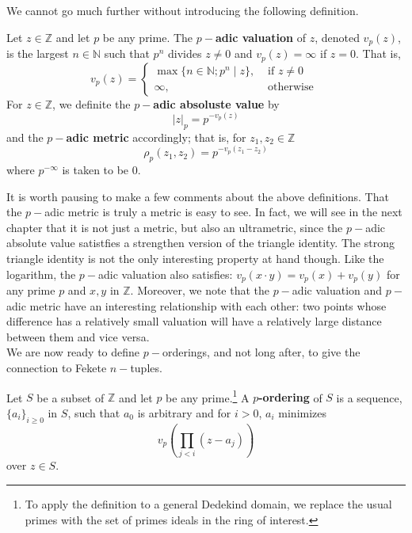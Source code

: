 We cannot go much further without introducing the following definition. 

\begin{definition}
Let $z \in \mathbb{Z}$ and let $p$ be any prime. The \textbf{$p-$adic valuation} of $z$, denoted $v_p(z)$, is the largest $n \in \mathbb{N}$ such that $p^n$ divides $z \neq 0$ and $v_p(z) = \infty$ if $z=0$. That is,
\[
v_p(z) = 
\begin{cases}
 \max\{n \in \mathbb{N}; p^n \mid z\}, & \text{ if } z \neq 0 \\
         \infty, & \text{ otherwise }
\end{cases}
\]
For $z \in \mathbb{Z}$, we definite the \textbf{$p-$adic absoluste value} by
\[ \lvert z \rvert_p = p^{-v_p(z)}\] and the \textbf{$p-$adic metric} accordingly; that is, for $z_1,z_2 \in \mathbb{Z}$
\[\rho_p(z_1,z_2) = p^{-v_p(z_1-z_2)}\]
where $p^{-\infty}$ is taken to be $0$. 
\end{definition}

It is worth pausing to make a few comments about the above definitions. That the $p-$adic metric is truly a metric is easy to see. In fact, we will see in the next chapter that it is not just a metric, but also an ultrametric, since the $p-$adic absolute value satistfies a strengthen version of the triangle identity. The strong triangle identity is not the only interesting property at hand though. Like the logarithm, the $p-$adic valuation also satisfies: $v_p(x \cdot y) = v_p(x) + v_p(y)$ for any prime $p$ and $x,y$ in $\mathbb{Z}$. Moreover, we note that the $p-$adic valuation and $p-$adic metric have an interesting relationship with each other: two points whose difference has a relatively small valuation will have a relatively large distance between them and vice versa. \\

We are now ready to define $p-$orderings, and not long after, to give the connection to Fekete $n-$tuples.\\

\begin{definition}
\cite{mb1} Let $S$ be a subset of $\mathbb{Z}$  and let $p$ be any prime.\footnote{To apply the definition to a general Dedekind domain, we replace the usual primes with the set of primes ideals in the ring of interest.} A \textbf{$p$-ordering} of $S$ is a sequence, $\{a_i\}_{i\geq 0}$ in $S$, such that $a_0$ is arbitrary and for $i >0$, $a_i$ minimizes 
\[ v_p (\prod_{j < i} (z - a_j) )\] over $z \in S$.
\end{definition}



